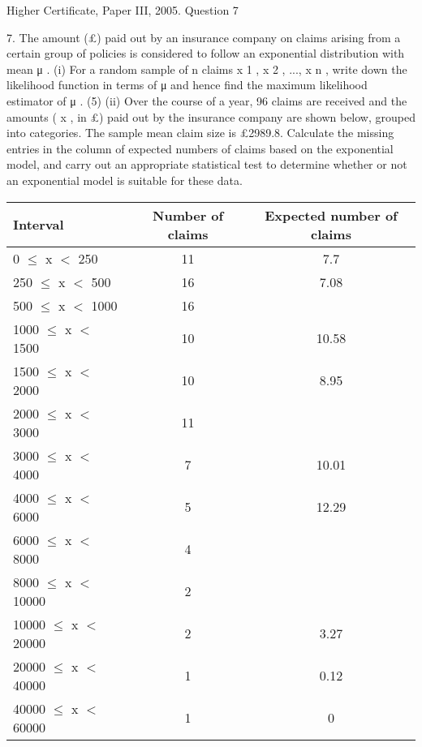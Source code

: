 \documentclass[a4paper,12pt]{article}
\begin{document}
Higher Certificate, Paper III, 2005. Question 7
\begin{framed}

7.
The amount (£) paid out by an insurance company on claims arising from a certain
group of policies is considered to follow an exponential distribution with mean μ .
(i) For a random sample of n claims x 1 , x 2 , ..., x n , write down the likelihood
function in terms of μ and hence find the maximum likelihood estimator of μ .
(5)
(ii) Over the course of a year, 96 claims are received and the amounts ( x , in £) paid
out by the insurance company are shown below, grouped into categories. The
sample mean claim size is £2989.8. Calculate the missing entries in the
column of expected numbers of claims based on the exponential model, and
carry out an appropriate statistical test to determine whether or not an
exponential model is suitable for these data.

\begin{center}
\begin{tabular}{|l|c|c|}
Interval	&	Number of claims	& 	Expected number of claims	\\ \hline 
0 $\leq$ x $<$ 250	&	11	& 	7.7	\\ \hline 
250 $\leq$ x $<$ 500	&	16	& 	7.08	\\ \hline 
500 $\leq$ x $<$ 1000	&	16	& 		\\ \hline 
1000 $\leq$ x $<$ 1500	&	10	& 	10.58	\\ \hline 
1500 $\leq$ x $<$ 2000	&	10	& 	8.95	\\ \hline 
2000 $\leq$ x $<$ 3000	&	11	& 		\\ \hline 
3000 $\leq$ x $<$ 4000	&	7	& 	10.01	\\ \hline 
4000 $\leq$ x $<$ 6000	&	5	& 	12.29	\\ \hline 
6000 $\leq$ x $<$ 8000	&	4	& 		\\ \hline 
8000 $\leq$ x $<$ 10000	&	2	& 		\\ \hline 
10000 $\leq$ x $<$ 20000	&	2	& 	3.27	\\ \hline 
20000 $\leq$ x $<$ 40000	&	1	& 	0.12	\\ \hline 
40000 $\leq$ x $<$ 60000	&	1	& 	0	\\ \hline 
\end{tabular}
\end{center}


\end{framed}
\end{document}
